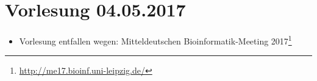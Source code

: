 \section{Vorlesung 04.05.2017}

\begin{itemize}
	\item Vorlesung entfallen wegen: Mitteldeutschen Bioinformatik-Meeting 2017\footnote{\url{http://me17.bioinf.uni-leipzig.de/}}
\end{itemize}